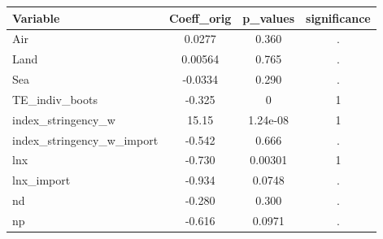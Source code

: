 \documentclass[]{article}
\begin{document}
\begin{tabular}{lccc} \hline
Variable & Coeff\_orig & p\_values & significance \\ \hline
Air & 0.0277 & 0.360 & . \\
Land & 0.00564 & 0.765 & . \\
Sea & -0.0334 & 0.290 & . \\
TE\_indiv\_boots & -0.325 & 0 & 1 \\
index\_stringency\_w & 15.15 & 1.24e-08 & 1 \\
index\_stringency\_w\_import & -0.542 & 0.666 & . \\
lnx & -0.730 & 0.00301 & 1 \\
lnx\_import & -0.934 & 0.0748 & . \\
nd & -0.280 & 0.300 & . \\
 np & -0.616 & 0.0971 & . \\ \hline
\end{tabular}
\end{document}
